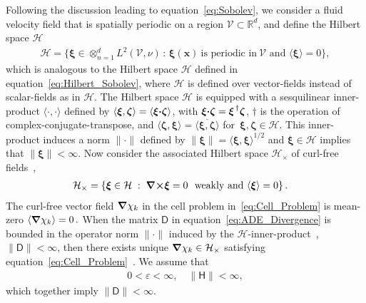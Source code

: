 \documentclass[english,12pt,jmp,graphicx]{revtex4-1}
\newcommand{\vecx}{\boldsymbol{x}}
\newcommand{\vecxi}{\boldsymbol{\xi}}
\newcommand{\veczeta}{\boldsymbol{\zeta}}
\newcommand{\bnabla}{\mbox{\boldmath${\nabla}$}}
\newcommand{\bcdot}{\mbox{\boldmath${\cdot}$}}
\newcommand{\btimes}{\mbox{\boldmath${\times}$}}
\newcommand{\Vc}{\mathcal{V}}
\newcommand{\Hs}{\mathscr{H}}
\newcommand{\Hc}{\mathcal{H}}
\newcommand{\Dm}{\mathsf{D}}
\newcommand{\Hm}{\mathsf{H}}
\begin{document}
Following the discussion leading to
equation~\eqref{eq:Sobolev}, we consider a fluid velocity field that
is spatially periodic on a region $\Vc\subset\mathbb{R}^d$, and define
the Hilbert space $\Hc$~\cite{Majda:Kramer:1999:book,Fannjiang:1997:1033}     
%
\begin{align}\label{eq:Hilbert_Space}
  \Hc=\{\vecxi\in\otimes_{n=1}^dL^2(\Vc,\nu)\,
              :\, \vecxi(\vecx)~\text{is periodic in}~\Vc
              \text{ and }\langle\vecxi\rangle=0\},
\end{align}
% 
which is analogous to the Hilbert space $\Hs$ defined in
equation~\eqref{eq:Hilbert_Sobolev}, where $\Hc$ is defined over
vector-fields instead of scalar-fields as in $\Hs$. The Hilbert space
$\Hc$ is equipped with a sesquilinear inner-product
$\langle\cdot,\cdot\rangle$ defined by
$\langle\vecxi,\veczeta\rangle=\langle\vecxi\bcdot\veczeta\rangle$,
with $\vecxi\bcdot\veczeta=\vecxi^{\,\dagger}\veczeta$, $\dagger$ is the operation
of complex-conjugate-transpose, and
$\langle\veczeta,\vecxi\rangle=\overline{\langle\vecxi,\veczeta\rangle}$
for $\,\vecxi,\veczeta\in\Hc$. This inner-product induces a norm $\|\cdot\|$
defined by $\|\vecxi\|=\langle\vecxi,\vecxi\rangle^{1/2}$ and
$\vecxi\in\Hc$ implies that $\|\vecxi\|<\infty$.
Now consider the associated Hilbert space $\Hc_\times$ of curl-free
fields~\cite{Golden:CMP-473,Avellaneda:CMP-339,Fannjiang:1994:SIAM_JAM:333,Fannjiang:1997:1033,Milton:2002:TC,Murphy:ADSTPF-2017},    
%
\begin{align}\label{eq:curlfreeHilbert}
  &\Hc_\times=
  \left\{\vecxi\in \Hc \;:\; \bnabla\btimes\vecxi=0
    \text{~ weakly and~}
    \langle\vecxi\rangle=0
  \right\}.
\end{align}
%
The curl-free vector field $\bnabla\chi_k$ in the cell
problem in~\eqref{eq:Cell_Problem} is mean-zero $\langle\bnabla\chi_k\rangle=0\,.$ When
the matrix $\Dm$ in equation~\eqref{eq:ADE_Divergence} is bounded in the
operator norm $\|\cdot\|$ induced by the $\Hc$-inner-product~\cite{Folland:99:RealAnalysis},
$\|\Dm\|<\infty$, then there exists unique
$\bnabla\chi_k\in\Hc_\times$ satisfying
equation~\eqref{eq:Cell_Problem}~\cite{Papanicolaou:RF-835,Golden:CMP-473}. We
assume that   
%
\begin{align}\label{eq:Bounded_H}
  0<\varepsilon<\infty,
  \quad
  \|\Hm\|<\infty,   
\end{align}
%
which together imply $\|\Dm\|<\infty$.
\end{document}
